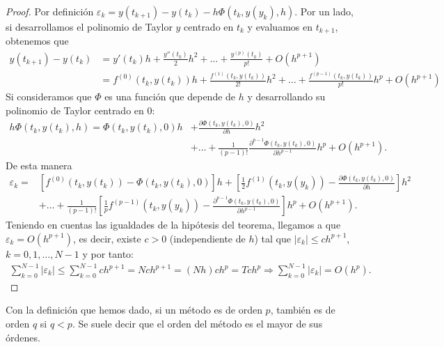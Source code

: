 \begin{proof}
    Por definición $\varepsilon_k = y(t_{k+1}) - y(t_k) - h\Phi(t_k,y(y_k),h)$.  Por un lado, si desarrollamos el polinomio de Taylor $y$ centrado en $t_k$ y evaluamos en $t_{k+1}$, obtenemos que
    \begin{align*}
        y(t_{k+1}) - y(t_k) & = y'(t_k)h + \frac{y''(t_k)}{2}h^2 + \ldots + \frac{y^{(p)}(t_k)}{p!} + O(h^{p+1})                                     \\
                            & = f^{(0)}(t_k,y(t_k))h + \frac{f^{(1)}(t_k,y(t_k))}{2!}h^2 + \ldots + \frac{f^{(p-1)}(t_k,y(t_k))}{p!}h^p + O(h^{p+1})
    \end{align*}
    Si consideramos que $\Phi$ es una función que depende de $h$ y desarrollando su polinomio de Taylor centrado en $0$:
    \begin{align*}
        h\Phi(t_k,y(t_k),h) = \Phi(t_k,y(t_k),0)h & + \frac{\partial \Phi(t_k,y(t_k),0)}{\partial h}h^2 \\&+ \ldots + \frac{1}{(p-1)!}\frac{\partial^{p-1} \Phi(t_k,y(t_k),0)}{\partial h^{p-1}}h^p + O(h^{p+1}) .
    \end{align*}
    De esta manera
    \begin{align*}
        \varepsilon_k = & [f^{(0)}(t_k,y(t_k)) - \Phi(t_k,y(t_k),0)]h + \left[\frac{1}{2}f^{(1)}(t_k,y(y_k)) - \frac{\partial \Phi(t_k,y(t_k),0)}{\partial h}  \right]h^2        \\
                        & +\ldots + \frac{1}{(p-1)!} \left[\frac{1}{p}f^{(p-1)}(t_k,y(y_k)) - \frac{\partial^{p-1} \Phi(t_k,y(t_k),0)}{\partial h^{p-1}}\right]h^p + O(h^{p+1}).
    \end{align*}
    Teniendo en cuentas las igualdades de la hipótesis del teorema, llegamos a que $\varepsilon_k = O(h^{p+1})$, es decir, existe $c > 0$ (independiente de $h$) tal que $|\varepsilon_k| \leq ch^{p+1}$, $k=0,1,\ldots,N-1$ y por tanto:
    \begin{align*}
        \sum_{k=0}^{N-1} |\varepsilon_k| \leq \sum_{k=0}^{N-1} ch^{p+1} = Nch^{p+1} = (Nh)ch^p = Tch^p \Longrightarrow\sum_{k=0}^{N-1} |\varepsilon_k| = O(h^p).
    \end{align*}
\end{proof}

\begin{obs}
    Con la definición que hemos dado, si un método es de orden $p$, también es de orden $q$ si $q < p$. Se suele decir que el orden del método es el mayor de sus órdenes.
\end{obs}

